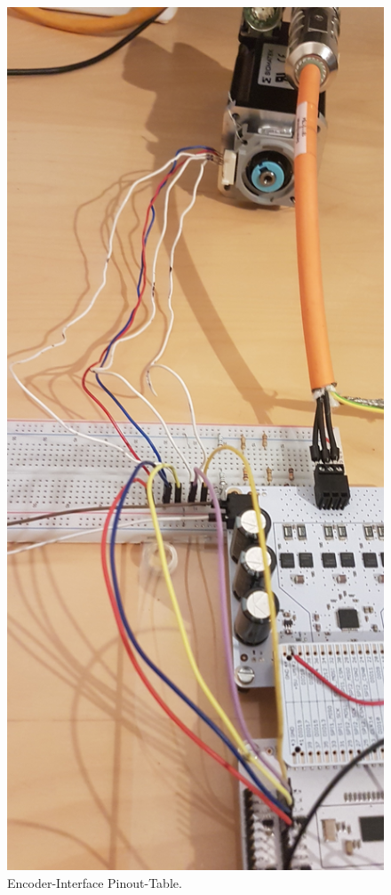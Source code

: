 \begin{figure}[H]
	\centering
	\includegraphics[angle = 270, width=\textwidth]{graphics/4_Antriebskette}
	\caption{Encoder-Interface Pinout-Table.}
	\label{fig:4_Antriebskette}
\end{figure}

